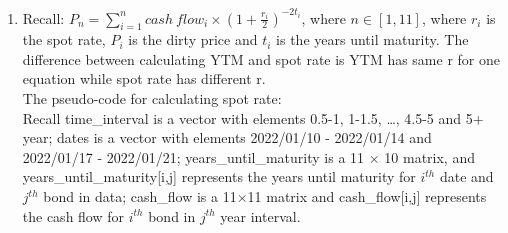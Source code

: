 \documentclass[10pt]{article}
\begin{document}
\begin{enumerate}
\begin{enumerate}
\begin{table}[H]
{\begin{tabular}{|c|c|c|c|c|c|c|c|c|c|c|}
                \end{tabular}}
            \end{table}
        \item 
            Recall: $P_n = \sum_{i = 1}^{n} {{cash \ flow_i} \times (1 + \frac{r_i}{2})^{-2 t_i}}$, where $n \in [1, 11]$, where $r_i$ is the spot rate, $P_i$ is the dirty price and $t_i$ is the years until maturity. The difference between calculating YTM and spot rate is YTM has same r for one equation while spot rate has different r. \\
            The pseudo-code for calculating spot rate: \\
            Recall time\_interval is a vector with elements 0.5-1, 1-1.5, \dots, 4.5-5 and 5+ year; dates is a vector with elements 2022/01/10 - 2022/01/14 and 2022/01/17 - 2022/01/21; years\_until\_maturity is a 11 $\times$ 10 matrix, and years\_until\_maturity[i,j] represents the years until maturity for $i^{th}$ date and $j^{th}$ bond in data; cash\_flow is a 11$\times$11 matrix and cash\_flow[i,j] represents the cash flow for $i^{th}$ bond in $j^{th}$ year interval.
            

\end{enumerate}
\end{enumerate}
\end{document}
